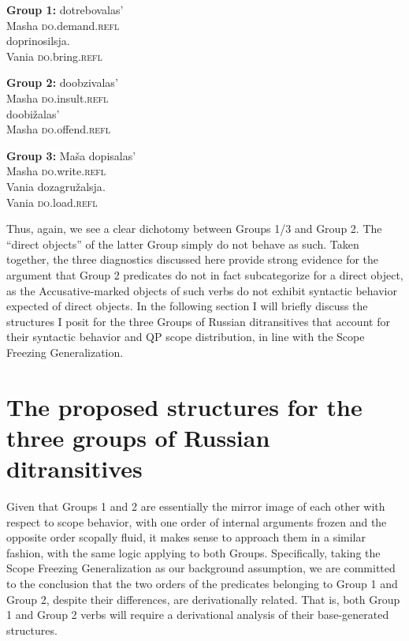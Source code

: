 \documentclass[output=paper,colorlinks,citecolor=brown,nonflat]{./langscibook}
\begin{document}
\ea%
    \label{ex:antonyuk:44}
    \textbf{Group 1:}
    \ea \label{ex:antonyuk:44a}
       {dotrebovalas’}\\
    {} Masha   \textsc{do}.demand.\textsc{refl}\\
    \ex \label{ex:antonyuk:44b}
       {doprinosilsja}.\\
    Vania   \textsc{do}.bring.\textsc{refl}\\
    \z
\z

\ea%
    \label{ex:antonyuk:45}
    \textbf{Group 2:}
    \ea \label{ex:antonyuk:45a}
       {doobzivalas’}\\
    Masha \textsc{do}.insult.\textsc{refl}\\
    \ex \label{ex:antonyuk:45b}
      {doobižalas’}\\
    Masha \textsc{do}.offend.\textsc{refl}\\
    \z
\z

\ea%
    \label{ex:antonyuk:46}
    \textbf{Group 3:}
    \ea \label{ex:antonyuk:46a}
     {Maša} {dopisalas’}\\
    { } Masha \textsc{do}.write.\textsc{refl}\\
    \ex \label{ex:antonyuk:46b}
    \gll {*} {Vania} {dozagružalsja}.\\
    { } Vania \textsc{do}.load.\textsc{refl}\\
    \z
\z

Thus, again, we see a clear dichotomy between Groups 1/3 and Group 2. The “direct objects” of the latter Group simply do not behave as such. Taken together, the three diagnostics discussed here provide strong evidence for the argument that Group 2 predicates do not in fact subcategorize for a direct object, as the Accusative-marked objects of such verbs do not exhibit syntactic behavior expected of direct objects. In the following section I will briefly discuss the structures I posit for the three Groups of Russian ditransitives that account for their syntactic behavior and QP scope distribution, in line with the Scope Freezing Generalization.

\section{The proposed structures for the three groups of Russian ditransitives}\label{sec:antonyuk:4}

Given that Groups 1 and 2 are essentially the mirror image of each other with respect to scope behavior, with one order of internal arguments frozen and the opposite order scopally fluid, it makes sense to approach them in a similar fashion, with the same logic applying to both Groups. Specifically, taking the Scope Freezing Generalization as our background assumption, we are committed to the conclusion that the two orders of the predicates belonging to Group 1 and Group 2, despite their differences, are derivationally related. That is, both Group 1 and Group 2 verbs will require a derivational analysis of their base-generated structures.
\end{document}
